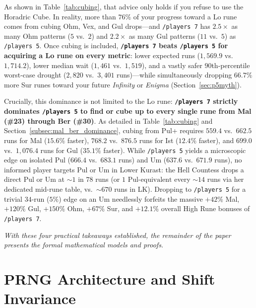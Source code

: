 \documentclass[11pt,reqno]{amsart}
\theoremstyle{definition}
\begin{document}
As shown in Table~\ref{tab:cubing}, that advice only holds if you refuse to use the Horadric Cube. In reality, more than $76\%$ of your progress toward a Lo rune comes from cubing Ohm, Vex, and Gul drops—and \texttt{/players~7} has $\mathbf{2.5\times}$ as many Ohm patterns ($5$ vs.\ $2$) and $\mathbf{2.2\times}$ as many Gul patterns ($11$ vs.\ $5$) as \texttt{/players~5}. Once cubing is included, \textbf{\texttt{/players~7} beats \texttt{/players~5} for acquiring a Lo rune on every metric}: lower expected runs ($1{,}569.9$ vs.\ $1{,}714.2$), lower median wait ($1{,}461$ vs.\ $1{,}519$), and a vastly safer $90$th-percentile worst-case drought ($2{,}820$ vs.\ $3{,}401$ runs)—while simultaneously dropping $66.7\%$ more Sur runes toward your future \emph{Infinity} or \emph{Enigma} (Section~\ref{sec:p5myth}).

Crucially, this dominance is not limited to the Lo rune: \textbf{\texttt{/players~7} strictly dominates \texttt{/players~5} to find or cube up to every single rune from Mal (\#23) through Ber (\#30)}. As detailed in Table~\ref{tab:cubing} and Section~\ref{subsec:mal_ber_dominance}, cubing from Pul+ requires $559.4$ vs.\ $662.5$ runs for Mal ($15.6\%$ faster), $768.2$ vs.\ $876.5$ runs for Ist ($12.4\%$ faster), and $699.0$ vs.\ $1{,}076.4$ runs for Gul ($35.1\%$ faster). While \texttt{/players~5} yields a microscopic edge on isolated Pul ($666.4$ vs.\ $683.1$ runs) and Um ($637.6$ vs.\ $671.9$ runs), no informed player targets Pul or Um in Lower Kurast: the Hell Countess drops a direct Pul or Um at $\sim 1\text{ in }78$ runs (or $1\text{ Pul-equivalent}$ every $\sim 14$ runs via her dedicated mid-rune table, vs.\ $\sim 670$ runs in LK). Dropping to \texttt{/players~5} for a trivial $34$-run ($5\%$) edge on an Um needlessly forfeits the massive $+42\%$ Mal, $+120\%$ Gul, $+150\%$ Ohm, $+67\%$ Sur, and $+12.1\%$ overall High Rune bonuses of \texttt{/players~7}.

\medskip
\noindent\emph{With these four practical takeaways established, the remainder of the paper presents the formal mathematical models and proofs.}

\section{PRNG Architecture and Shift Invariance}
\label{sec:prng}
\end{document}
